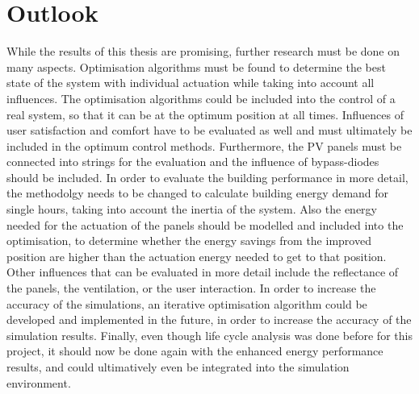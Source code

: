 \chapter{Outlook}
\label{ch:outlook}

While the results of this thesis are promising, further research must be done on many aspects. Optimisation algorithms must be found to determine the best state of the system with individual actuation while taking into account all influences. The optimisation algorithms could be included into the control of a real system, so that it can be at the optimum position at all times. Influences of user satisfaction and comfort have to be evaluated as well and must ultimately be included in the optimum control methods. Furthermore, the PV panels must be connected into strings for the evaluation and the influence of bypass-diodes should be included. In order to evaluate the building performance in more detail, the methodolgy needs to be changed to calculate building energy demand for single hours, taking into account the inertia of the system. Also the energy needed for the actuation of the panels should be modelled and included into the optimisation, to determine whether the energy savings from the improved position are higher than the actuation energy needed to get to that position. Other influences that can be evaluated in more detail include the reflectance of the panels, the ventilation, or the user interaction. In order to increase the accuracy of the simulations, an iterative optimisation algorithm could be developed and implemented in the future, in order to increase the accuracy of the simulation results. Finally, even though life cycle analysis was done before for this project, it should now be done again with the enhanced energy performance results, and could ultimatively even be integrated into the simulation environment. 





